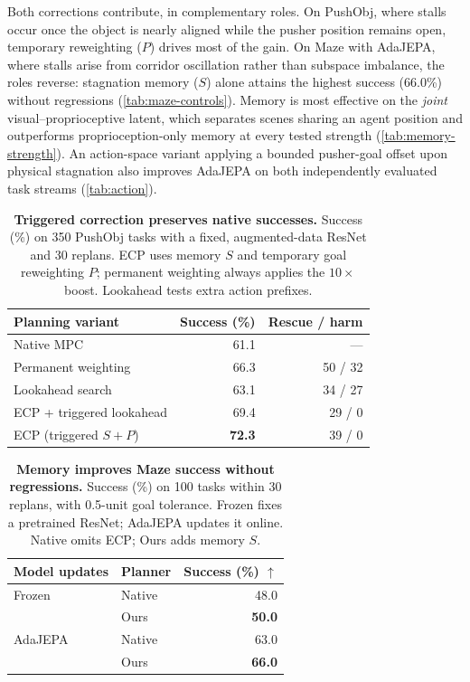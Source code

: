 \par\smallskip\noindent Both corrections contribute, in complementary roles.
On PushObj, where stalls occur once the object is nearly aligned while the pusher position remains open, temporary reweighting ($P$) drives most of the gain. On Maze with AdaJEPA, where stalls arise from corridor oscillation rather than subspace imbalance, the roles reverse: stagnation memory ($S$) alone attains the highest success (66.0\%) without regressions (\cref{tab:maze-controls}). Memory is most effective on the \emph{joint} visual--proprioceptive latent, which separates scenes sharing an agent position and outperforms proprioception-only memory at every tested strength (\cref{tab:memory-strength}). An action-space variant applying a bounded pusher-goal offset upon physical stagnation also improves AdaJEPA on both independently evaluated task streams (\cref{tab:action}).

\begin{table}[t]
\centering
\caption{\textbf{Triggered correction preserves native successes.} Success (\%) on 350 PushObj tasks with a fixed, augmented-data ResNet and 30 replans. ECP uses memory $S$ and temporary goal reweighting $P$; permanent weighting always applies the $10\times$ boost. Lookahead tests extra action prefixes.}
\label{tab:timing}
\small
\begin{tabular}{lrr}
\toprule
Planning variant & Success (\%) & Rescue / harm\\
\midrule
Native MPC &61.1&---\\
Permanent weighting &66.3&50 / 32\\
Lookahead search &63.1&34 / 27\\
ECP + triggered lookahead &69.4&29 / 0\\
ECP (triggered $S{+}P$) &\textbf{72.3}&39 / 0\\
\bottomrule
\end{tabular}
\end{table}

\begin{table}[t]
\centering
\caption{\textbf{Memory improves Maze success without regressions.} Success (\%) on 100 tasks within 30 replans, with 0.5-unit goal tolerance. Frozen fixes a pretrained ResNet; AdaJEPA updates it online. Native omits ECP; Ours adds memory $S$.}
\label{tab:maze}
\small
\begin{tabular*}{0.94\columnwidth}{@{\extracolsep{\fill}}llr@{}}
\toprule
Model updates & Planner & Success (\%) $\uparrow$\\
\midrule
Frozen & Native &48.0\\
& Ours &\textbf{50.0}\\
AdaJEPA & Native &63.0\\
& Ours &\textbf{66.0}\\
\bottomrule
\end{tabular*}
\end{table}

